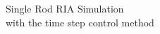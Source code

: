 \begin{frame}{}
    \centering
    \Huge{Single Rod RIA Simulation}\\
    \large{with the time step control method}
\end{frame}